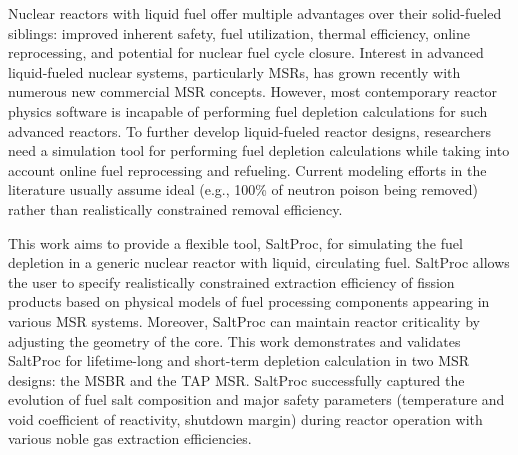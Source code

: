 Nuclear reactors with liquid fuel offer multiple advantages over their 
solid-fueled siblings: improved inherent safety, fuel utilization, thermal 
efficiency, online reprocessing, and potential for nuclear fuel cycle closure. 
Interest in advanced liquid-fueled nuclear systems, particularly \glspl{MSR}, 
has grown recently with numerous new commercial \gls{MSR} concepts. 
However, most contemporary reactor physics software is incapable of performing 
fuel depletion calculations for such advanced reactors. To further 
develop liquid-fueled reactor designs, researchers need a simulation tool for 
performing fuel depletion calculations while taking into account online fuel 
reprocessing and refueling. Current modeling efforts in the literature usually 
assume ideal (e.g., 100\% of neutron poison being removed) rather than 
realistically constrained removal efficiency. 

This work aims to provide a flexible tool, SaltProc, for simulating the fuel 
depletion in a generic nuclear reactor with liquid, circulating fuel. 
SaltProc allows the user to specify realistically constrained extraction 
efficiency of fission products based on physical models of fuel processing 
components appearing in various \gls{MSR} systems. Moreover, SaltProc can 
maintain reactor criticality by adjusting the geometry of the core. This 
work demonstrates and validates SaltProc for lifetime-long and short-term 
depletion calculation in two \gls{MSR} designs: the \gls{MSBR} and the 
\gls{TAP} \gls{MSR}. SaltProc successfully captured the evolution of fuel salt 
composition and major safety parameters (temperature and void coefficient of 
reactivity, shutdown margin) during reactor operation with various noble gas 
extraction efficiencies.